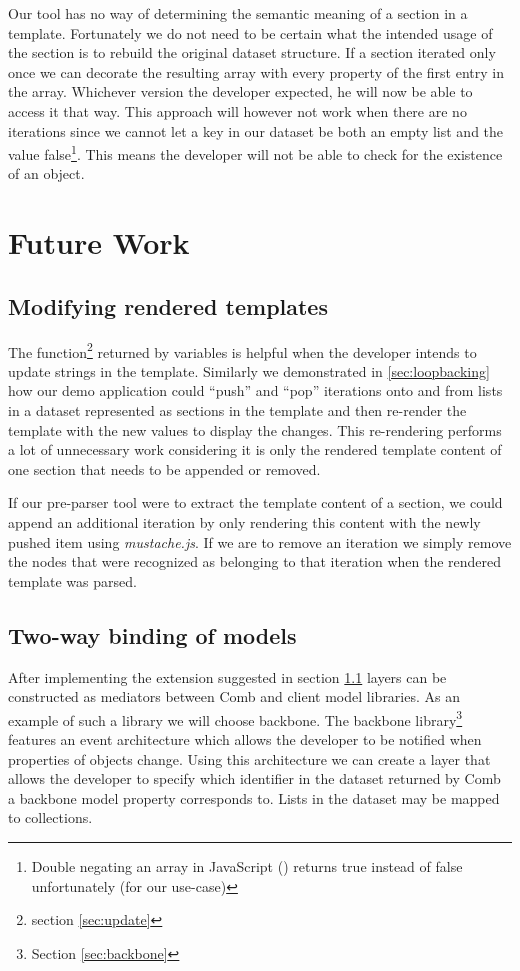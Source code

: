 \documentclass[thesis.tex]{subfiles}
\begin{document}
Our tool has no way of determining the semantic meaning of a section in a
template.
Fortunately we do not need to be certain what the intended usage of the section
is to rebuild the original dataset structure.
If a section iterated only once we can decorate the resulting array with every
property of the first entry in the array. Whichever version the developer
expected, he will now be able to access it that way. This approach will however
not work when there are no iterations since we cannot let a key in our dataset
be both an empty list and the value false\footnote{
	Double negating an array in JavaScript (\inline{\!\![]}) returns true instead
	of false unfortunately (for our use-case)
}. This means the developer will not be able to check for the existence of an
object.




\section{Future Work}

\subsection{Modifying rendered templates}
\label{sec:update-dom}
The  function\footnote{section \ref{sec:update}} returned by
variables is helpful when the developer intends to update strings in the
template. Similarly we demonstrated in \ref{sec:loopbacking} how our
demo application could ``push'' and ``pop'' iterations onto and from lists in
a dataset represented as sections in the template and then re-render the
template with the new values to display the changes.
This re-rendering performs a lot of unnecessary work considering it is only
the rendered template content of one section that needs to be appended or
removed.

If our pre-parser tool were to extract the template content of a section, we
could append an additional iteration by only rendering this content with the
newly pushed item using \emph{mustache.js}.
If we are to remove an iteration we simply remove the nodes that were recognized
as belonging to that iteration when the rendered template was parsed.

\subsection{Two-way binding of models}
\label{sec:two-way-binding}
After implementing the extension suggested in section \ref{sec:update-dom}
layers can be constructed as mediators between Comb and client model libraries.
As an example of such a library we will choose backbone.
The backbone library\footnote{Section \ref{sec:backbone}} features an event
architecture which allows the developer to be notified when properties of
objects change.
Using this architecture we can create a layer that allows the
developer to specify which identifier in the dataset returned by Comb a
backbone model property corresponds to. Lists in the dataset may be mapped to
collections.
\end{document}
